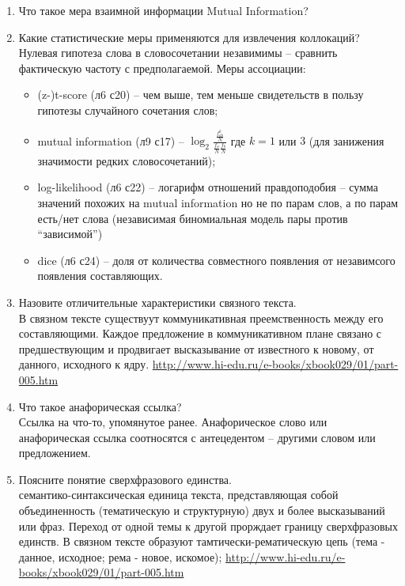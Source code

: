 \documentclass[a4paper]{article}
\newcommand{\eng}[1]{\foreignlanguage{english}{#1}}
\begin{document}
\begin{enumerate}
	\item Что такое мера взаимной информации Mutual Information?\hfill\\
	\item Какие статистические меры применяются для извлечения коллокаций?\hfill\\
	Нулевая гипотеза слова в словосочетании незавимимы -- сравнить фактическую частоту с предполагаемой. Меры ассоциации: \begin{itemize}
		\item \eng{(z-)t-score} (л6 с20) -- чем выше, тем меньше свидетельств в пользу гипотезы случайного сочетания слов;
		\item \eng{mutual information} (л9 с17) -- $\log_2 \frac{ \frac{f_{ab}^k}{N}}{ \frac{f_a}{N}\frac{f_b}{N}}$ где $k = 1$ или $3$ (для занижения значимости редких словосочетаний);  
		\item \eng{log-likelihood} (л6 с22) -- логарифм отношений правдоподобия -- сумма значений похожих на mutual information но не по парам слов, а по парам есть/нет слова (независимая биномиальная модель пары против ``зависимой'')
		\item \eng{dice} (л6 с24) -- доля от количества совместного появления от незавимсого появления составляющих.
	\end{itemize}

	\item Назовите отличительные характеристики связного текста.\hfill\\
	В связном тексте существуут коммуникативная преемственность между его составляющими. Каждое предложение в коммуникативном плане связано с предшествующим и продвигает высказывание от известного к новому, от данного, исходного к ядру.
	\url{http://www.hi-edu.ru/e-books/xbook029/01/part-005.htm}

	\item Что такое анафорическая ссылка?\hfill\\
	Ссылка на что-то, упомянутое ранее. Анафорическое слово или анафорическая ссылка соотносятся с антецедентом -- другими словом или предложением.

	\item Поясните понятие сверхфразового единства.\hfill\\
	семантико-синтаксическая единица текста, представляющая собой объединенность (тематическую и структурную) двух и более высказываний или фраз. Переход от одной темы к другой прорждает границу сверхфразовых единств. В связном тексте образуют тамтически-рематическую цепь (тема - данное, исходное; рема - новое, искомое);
	\url{http://www.hi-edu.ru/e-books/xbook029/01/part-005.htm}


\end{enumerate}
\end{document}
